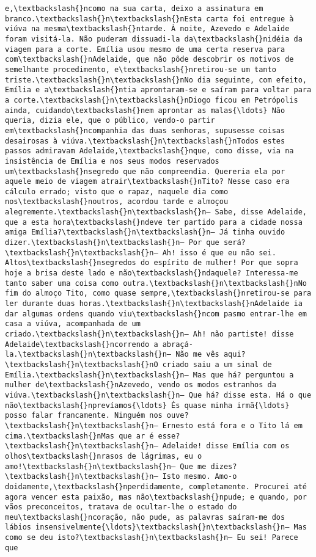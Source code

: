 \documentclass[11pt]{article}
\begin{document}
\begin{Verbatim}[commandchars=\\\{\}]
e,\textbackslash{}ncomo na sua carta, deixo a assinatura em branco.\textbackslash{}n\textbackslash{}nEsta carta foi entregue à viúva na mesma\textbackslash{}ntarde. À noite, Azevedo e Adelaide foram visitá-la. Não puderam dissuadi-la da\textbackslash{}nidéia da viagem para a corte. Emília usou mesmo de uma certa reserva para com\textbackslash{}nAdelaide, que não pôde descobrir os motivos de semelhante procedimento, e\textbackslash{}nretirou-se um tanto triste.\textbackslash{}n\textbackslash{}nNo dia seguinte, com efeito, Emília e a\textbackslash{}ntia aprontaram-se e saíram para voltar para a corte.\textbackslash{}n\textbackslash{}nDiogo ficou em Petrópolis ainda, cuidando\textbackslash{}nem aprontar as malas{\ldots} Não queria, dizia ele, que o público, vendo-o partir em\textbackslash{}ncompanhia das duas senhoras, supusesse coisas desairosas à viúva.\textbackslash{}n\textbackslash{}nTodos estes passos admiravam Adelaide,\textbackslash{}nque, como disse, via na insistência de Emília e nos seus modos reservados um\textbackslash{}nsegredo que não compreendia. Quereria ela por aquele meio de viagem atrair\textbackslash{}nTito? Nesse caso era cálculo errado; visto que o rapaz, naquele dia como nos\textbackslash{}noutros, acordou tarde e almoçou alegremente.\textbackslash{}n\textbackslash{}n— Sabe, disse Adelaide, que a esta hora\textbackslash{}ndeve ter partido para a cidade nossa amiga Emília?\textbackslash{}n\textbackslash{}n— Já tinha ouvido dizer.\textbackslash{}n\textbackslash{}n— Por que será?\textbackslash{}n\textbackslash{}n— Ah! isso é que eu não sei. Altos\textbackslash{}nsegredos do espírito de mulher! Por que sopra hoje a brisa deste lado e não\textbackslash{}ndaquele? Interessa-me tanto saber uma coisa como outra.\textbackslash{}n\textbackslash{}nNo fim do almoço Tito, como quase sempre,\textbackslash{}nretirou-se para ler durante duas horas.\textbackslash{}n\textbackslash{}nAdelaide ia dar algumas ordens quando viu\textbackslash{}ncom pasmo entrar-lhe em casa a viúva, acompanhada de um criado.\textbackslash{}n\textbackslash{}n— Ah! não partiste! disse Adelaide\textbackslash{}ncorrendo a abraçá-la.\textbackslash{}n\textbackslash{}n— Não me vês aqui?\textbackslash{}n\textbackslash{}nO criado saiu a um sinal de Emília.\textbackslash{}n\textbackslash{}n— Mas que há? perguntou a mulher de\textbackslash{}nAzevedo, vendo os modos estranhos da viúva.\textbackslash{}n\textbackslash{}n— Que há? disse esta. Há o que não\textbackslash{}nprevíamos{\ldots} És quase minha irmã{\ldots} posso falar francamente. Ninguém nos ouve?\textbackslash{}n\textbackslash{}n— Ernesto está fora e o Tito lá em cima.\textbackslash{}nMas que ar é esse?\textbackslash{}n\textbackslash{}n— Adelaide! disse Emília com os olhos\textbackslash{}nrasos de lágrimas, eu o amo!\textbackslash{}n\textbackslash{}n— Que me dizes?\textbackslash{}n\textbackslash{}n— Isto mesmo. Amo-o doidamente,\textbackslash{}nperdidamente, completamente. Procurei até agora vencer esta paixão, mas não\textbackslash{}npude; e quando, por vãos preconceitos, tratava de ocultar-lhe o estado do meu\textbackslash{}ncoração, não pude, as palavras saíram-me dos lábios insensivelmente{\ldots}\textbackslash{}n\textbackslash{}n— Mas como se deu isto?\textbackslash{}n\textbackslash{}n— Eu sei! Parece que 
\end{Verbatim}
\end{document}
